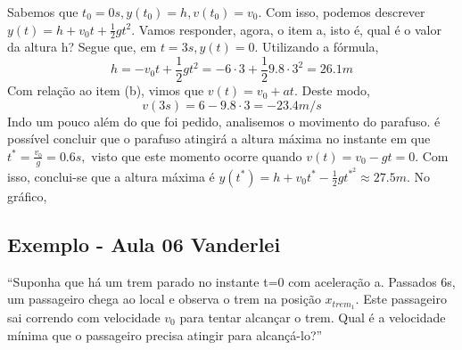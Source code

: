 \documentclass[physics_notes.tex]{subfiles}
\begin{document}
Sabemos que $t_{0} = 0s, y(t_{0}) = h, v(t_{0}) = v_{0}.$ Com isso, podemos descrever $y(t) = h + v_{0}t + \frac{1}{2}gt^{2}$. Vamos responder, agora, o item a, isto é, qual é o valor
da altura h? Segue que, em $t=3s, y(t) = 0$. Utilizando a fórmula,
$$
	h = -v_{0}t + \frac{1}{2}gt^{2} = -6 \cdot3 + \frac{1}{2}9.8 \cdot 3^{2} = 26.1m
$$
Com relação ao item (b), vimos que $v(t) = v_{0} + at.$ Deste modo,
$$
	v(3s) = 6 - 9.8 \cdot 3 = -23.4m/s
$$
Indo um pouco além do que foi pedido, analisemos o movimento do parafuso. é possível concluir que o parafuso atingirá a altura
máxima no instante em que $t^{*} = \frac{v_{0}}{g} = 0.6s,$ visto que este momento ocorre quando $v(t) = v_{0} - gt = 0$. Com isso,
conclui-se que a altura máxima é $y(t^{*}) = h + v_{0}t^{*} - \frac{1}{2}gt^{*^{2}} \approx 27.5m.$ No gráfico,
\begin{center}
\end{center}

\subsection{Exemplo - Aula 06 Vanderlei}
``Suponha que há um trem parado no instante t=0 com aceleração a. Passados 6s, um passageiro chega ao local e observa o trem na posição $x_{trem_{1}}$.
Este passageiro sai correndo com velocidade $v_{0}$ para tentar alcançar o trem. Qual é a velocidade mínima que o passageiro precisa atingir
para alcançá-lo?''
\end{document}
